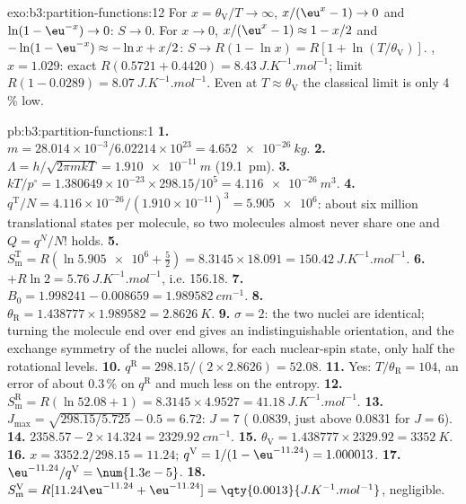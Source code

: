 \begin{solution}{exo:b3:partition-functions:12}
For $x = \theta_{\mathrm V}/T \to \infty$, $x/(\eu^x - 1) \to 0$ and $\ln(1 - \eu^{-x}) \to 0$: $S \to 0$. For $x \to 0$,
$x/(\eu^x - 1) \approx 1 - x/2$ and $-\ln(1 - \eu^{-x}) \approx -\ln x + x/2$: $S \to R(1 - \ln x) = R[1 + \ln(T/\theta_{\mathrm V})]$.
, $x = 1.029$: exact $R(0.5721 + 0.4420) = \qty{8.43}{J.K^{-1}.mol^{-1}}$; limit $R(1 - 0.0289) =
\qty{8.07}{J.K^{-1}.mol^{-1}}$. Even at $T \approx \theta_{\mathrm V}$ the classical limit is only 4\,\% low.
\end{solution}

\begin{solution}{pb:b3:partition-functions:1}
\textbf{1.} $m = 28.014\times10^{-3}/6.02214\times10^{23} = \qty{4.652e-26}{kg}$.
\textbf{2.} $\Lambda = h/\sqrt{2\pi mkT} = \qty{1.910e-11}{m}$ (\qty{19.1}{pm}).
\textbf{3.} $kT/p^\circ = 1.380649\times10^{-23} \times 298.15/10^5 = \qty{4.116e-26}{m^3}$.
\textbf{4.} $q^{\mathrm T}/N = 4.116\times10^{-26}/(1.910\times10^{-11})^3 = \num{5.905e6}$: about six million
translational states per molecule, so two molecules almost never share one and
$Q = q^N/N!$ holds.
\textbf{5.} $S^{\mathrm T}_{\mathrm m} = R(\ln\num{5.905e6} + \frac52) = 8.3145 \times 18.091 = \qty{150.42}{J.K^{-1}.mol^{-1}}$.
\textbf{6.} $+R\ln2 = \qty{5.76}{J.K^{-1}.mol^{-1}}$, i.e. \num{156.18}.
\textbf{7.} $B_0 = 1.998241 - 0.008659 = \qty{1.989582}{cm^{-1}}$.
\textbf{8.} $\theta_{\mathrm R} = 1.438777 \times 1.989582 = \qty{2.8626}{K}$.
\textbf{9.} $\sigma = 2$: the two nuclei are identical; turning the molecule end over end
gives an indistinguishable orientation, and the exchange symmetry of the
nuclei allows, for each nuclear-spin state, only half the rotational levels.
\textbf{10.} $q^{\mathrm R} = 298.15/(2 \times 2.8626) = 52.08$.
\textbf{11.} Yes: $T/\theta_{\mathrm R} = 104$, an error of about 0.3\,\% on $q^{\mathrm R}$ and much less on the
entropy.
\textbf{12.} $S^{\mathrm R}_{\mathrm m} = R(\ln52.08 + 1) = 8.3145 \times 4.9527 = \qty{41.18}{J.K^{-1}.mol^{-1}}$.
\textbf{13.} $J_{\max} = \sqrt{298.15/5.725} - 0.5 = 6.72$: $J = 7$ ( 0.0839, just above
0.0831 for $J = 6$).
\textbf{14.} $2358.57 - 2 \times 14.324 = \qty{2329.92}{cm^{-1}}$.
\textbf{15.} $\theta_{\mathrm V} = 1.438777 \times 2329.92 = \qty{3352}{K}$.
\textbf{16.} $x = 3352.2/298.15 = 11.24$; $q^{\mathrm V} = 1/(1 - \eu^{-11.24}) = 1.000013$.
\textbf{17.} $\eu^{-11.24}/q^{\mathrm V} = \num{1.3e-5}$.
\textbf{18.} $S^{\mathrm V}_{\mathrm m} = R[11.24\eu^{-11.24} + \eu^{-11.24}] = \qty{0.0013}{J.K^{-1}.mol^{-1}}$, negligible.

\end{solution}
